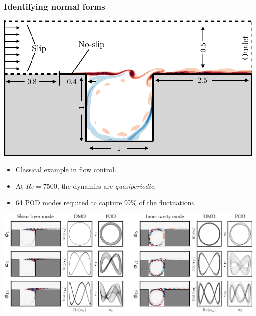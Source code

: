 \documentclass[aspectratio=169,compress,12pt,dvipsnames]{beamer}
\begin{document}


\begin{frame}
    \frametitle{Identifying normal forms}
    \vfill
    \begin{minipage}{.38\textwidth}
        \centering
        \includegraphics[width=\textwidth]{imgs/cavity_geomtry.png}
    \end{minipage}%
    \hfill
    \begin{minipage}{.58\textwidth}
        \begin{itemize}
            \item Classical example in flow control.
            \par\bigskip
            \item At $Re = 7500$, the dynamics are \emph{quasiperiodic}.
            \par\bigskip
            \item 64 POD modes required to capture 99\% of the fluctuations.
        \end{itemize}
    \end{minipage}
    \vfill
\end{frame}

\begin{frame}
    \vfill
    \centering
    \includegraphics[width=\textwidth]{imgs/pod_modes.png}
    \vfill
\end{frame}
\end{document}
